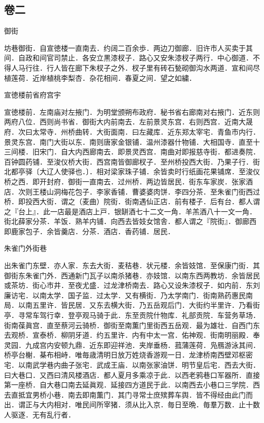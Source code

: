 \documentclass[]{article}
\begin{document}
\hypertarget{header-n25}{%
\subsection{卷二}\label{header-n25}}

御街

坊巷御街．自宣徳楼一直南去．约阔二百余歩．两边刀御廊．旧许市人买卖于其间．自政和间官司禁止．各安立黒漆杈子．路心又安朱漆杈子两行．中心御道．不得人马行往．行人皆在廊下朱杈子之外．杈子里有砖石甃砌御沟水两道．宣和间尽植莲荷．近岸植桃李梨杏．杂花相间．春夏之间．望之如繍．

宣徳楼前省府宫宇

宣徳楼前．左南庙对左掖门．为明堂颁朔布政府．秘书省右廊南对右掖门．近东则两府八位．西则尚书省．御街大内前南去．左前景灵东宫．右则西宫．近南大晟府．次曰太常寺．州桥曲转．大街面南．曰左藏库．近东郑太宰宅．青鱼市内行．景灵东宫．南门大街以东．南则唐家金银铺．温州漆器什物铺．大相国寺．直至十三间楼．旧宋门．自大内西廊南去．即景灵西宫．南曲对即报慈寺街．都进奏院．百钟圆药铺．至浚仪桥大街．西宫南皆御廊杈子．至州桥投西大街．乃果子行．街北都亭驿〔大辽人使驿也．〕．相对梁家珠子铺．余皆卖时行纸画花果铺席．至浚仪桥之西．即开封府．御街一直南去．过州桥．两边皆居民．街东车家炭．张家酒店．次则王楼山洞梅花包子．李家香铺．曹婆婆肉饼．李四分茶．至朱雀门街西过桥．即投西大街．谓之（麦曲）院街．街南遇仙正店．前有楼子．后有台．都人谓之『台上』．此一店最是酒店上戸．银缾酒七十二文一角．羊羔酒八十一文一角．街北薛家分茶．羊饭．熟羊内铺．向西去皆妓女馆舎．都人谓之『院街』．御廊西即鹿家包子．余皆羹店．分茶．酒店．香药铺．居民．

朱雀门外街巷

出朱雀门东壁．亦人家．东去大街．麦秸巷．状元楼．余皆妓馆．至保康门街．其御街东朱雀门外．西通新门瓦子以南杀猪巷．亦妓馆．以南东西两教坊．余皆居民或茶坊．街心市井．至夜尤盛．过龙津桥南去．路心又设朱漆杈子．如内前．东刘廉访宅．以南太学．国子监．过太学．又有横街．乃太学南门．街南熟药惠民南局．以南五里许．皆民居．又东去横大街．乃五岳观后门．大街约半里许．乃看街亭．寻常车驾行幸．登亭观马骑于此．东至贡院什物库．礼部贡院．车营务草场．街南葆眞宫．直至蔡河云骑桥．御街至南薫门里街西五岳观．最为雄壮．自西门东去观桥．宣泰桥．柳阴牙道．约五里许．内有中太一宫．佑神观．街南明丽殿．奉灵园．九成宫内安顿九鼎．近东即迎祥池．夹岸垂杨．菰蒲莲荷．凫鴈游泳其间．桥亭台榭．棊布相峙．唯毎歳清明日放万姓烧香游观一日．龙津桥南西壁邓枢密宅．以南武学巷内曲子张宅．武成王庙．以南张家油饼．明节皇后宅．西去大街．曰大巷口．又西曰清风楼酒店．都人夏月多乘凉于此．以西老鸦巷口军器所．直接第一座桥．自大巷口南去延眞观．延接四方道民于此．以南西去小巷口三学院．西去直抵宜男桥小巷．南去即南薫门．其门寻常士庶殡葬车舆．皆不得经由此门而出．谓正与大内相对．唯民间所宰猪．须从比入京．毎日至晩．毎羣万数．止十数人驱逐．无有乱行者．
\end{document}
